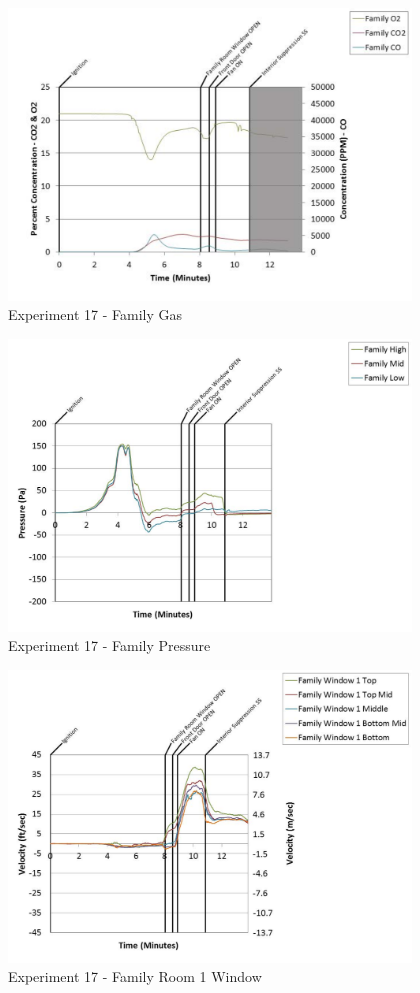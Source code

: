 \documentclass{article}
\begin{document}
\begin{appendices}
	\begin{figure}[h!]
		\centering
		\includegraphics[height=3.05in]{0_Images/Results_Charts/Exp_17_Charts/FamilyGas.pdf}
		\caption{Experiment 17 - Family Gas}
	\end{figure}
 
	\clearpage

	\begin{figure}[h!]
		\centering
		\includegraphics[height=3.05in]{0_Images/Results_Charts/Exp_17_Charts/FamilyPressure.pdf}
		\caption{Experiment 17 - Family Pressure}
	\end{figure}
 

	\begin{figure}[h!]
		\centering
		\includegraphics[height=3.05in]{0_Images/Results_Charts/Exp_17_Charts/FamilyRoom1Window.pdf}
		\caption{Experiment 17 - Family Room 1 Window}
	\end{figure}
 

\end{appendices}
\end{document}
